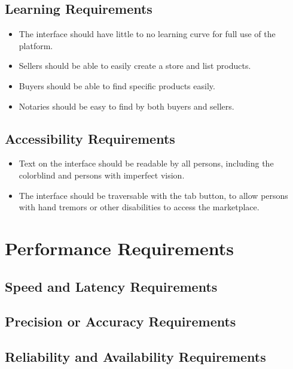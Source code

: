 \documentclass{article}
\begin{document}
\subsection{Learning Requirements}
\begin{itemize}
\item
The interface should have little to no learning curve for full use of the platform.

\item
Sellers should be able to easily create a store and list products.

\item
Buyers should be able to find specific products easily.

\item
Notaries should be easy to find by both buyers and sellers.
\end{itemize}


\subsection{Accessibility Requirements}
\begin{itemize}
\item
Text on the interface should be readable by all persons, including the colorblind and persons with imperfect vision.

\item
The interface should be traversable with the tab button, to allow persons with hand tremors or other disabilities to access the marketplace.


\end{itemize}

\section{Performance Requirements}
\subsection{Speed and Latency Requirements}



\subsection{Precision or Accuracy Requirements}


\subsection{Reliability and Availability Requirements}
\end{document}
